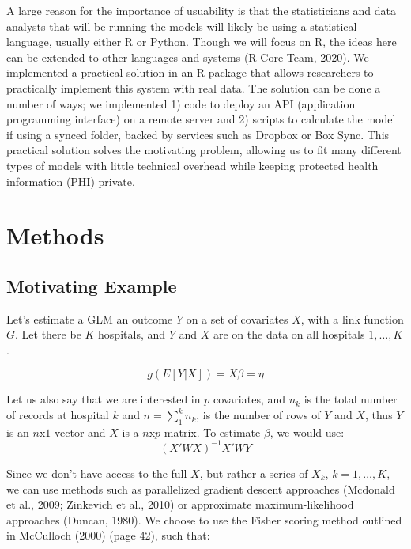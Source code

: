 \documentclass[]{elsarticle} %
\begin{document}
A large reason for the importance of usuability is that the
statisticians and data analysts that will be running the models will
likely be using a statistical language, usually either R or Python.
Though we will focus on R, the ideas here can be extended to other
languages and systems (R Core Team, 2020). We implemented a practical
solution in an R package that allows researchers to practically
implement this system with real data. The solution can be done a number
of ways; we implemented 1) code to deploy an API (application
programming interface) on a remote server and 2) scripts to calculate
the model if using a synced folder, backed by services such as Dropbox
or Box Sync. This practical solution solves the motivating problem,
allowing us to fit many different types of models with little technical
overhead while keeping protected health information (PHI) private.

\hypertarget{methods}{%
\section{Methods}\label{methods}}

\hypertarget{motivating-example}{%
\subsection{Motivating Example}\label{motivating-example}}

Let's estimate a GLM an outcome \(Y\) on a set of covariates \(X\), with
a link function \(G\). Let there be \(K\) hospitals, and \(Y\) and \(X\)
are on the data on all hospitals \(1, \dots, K\).

\[
g(E[Y | X]) = X\beta = \eta
\]

Let us also say that we are interested in \(p\) covariates, and
\(n_{k}\) is the total number of records at hospital \(k\) and
\(n = \sum_{1}^{k} n_{k}\), is the number of rows of \(Y\) and \(X\),
thus \(Y\) is an \(n\text{x}1\) vector and \(X\) is a \(n\text{x}p\)
matrix. To estimate \(\beta\), we would use: \[
(X'WX)^{-1} X'WY
\]

Since we don't have access to the full \(X\), but rather a series of
\(X_{k}\), \(k = 1, \dots, K\), we can use methods such as parallelized
gradient descent approaches (Mcdonald et al., 2009; Zinkevich et al.,
2010) or approximate maximum-likelihood approaches (Duncan, 1980). We
choose to use the Fisher scoring method outlined in McCulloch (2000)
(page 42), such that:
\end{document}
